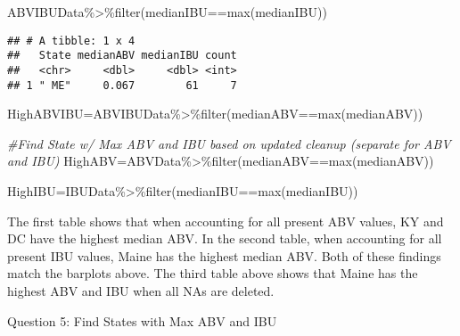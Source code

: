 \documentclass[
]{article}
\newenvironment{Shaded}{\begin{snugshade}}{\end{snugshade}}
\newcommand{\CommentTok}[1]{\textcolor[rgb]{0.56,0.35,0.01}{\textit{#1}}}
\newcommand{\FunctionTok}[1]{\textcolor[rgb]{0.00,0.00,0.00}{#1}}
\newcommand{\NormalTok}[1]{#1}
\newcommand{\OtherTok}[1]{\textcolor[rgb]{0.56,0.35,0.01}{#1}}
\newcommand{\SpecialCharTok}[1]{\textcolor[rgb]{0.00,0.00,0.00}{#1}}
\begin{document}
\begin{Shaded}
\begin{Highlighting}[]
\NormalTok{ABVIBUData}\SpecialCharTok{\%\textgreater{}\%}\FunctionTok{filter}\NormalTok{(medianIBU}\SpecialCharTok{==}\FunctionTok{max}\NormalTok{(medianIBU))}
\end{Highlighting}
\end{Shaded}

\begin{verbatim}
## # A tibble: 1 x 4
##   State medianABV medianIBU count
##   <chr>     <dbl>     <dbl> <int>
## 1 " ME"     0.067        61     7
\end{verbatim}

\begin{Shaded}
\begin{Highlighting}[]
\NormalTok{HighABVIBU}\OtherTok{=}\NormalTok{ABVIBUData}\SpecialCharTok{\%\textgreater{}\%}\FunctionTok{filter}\NormalTok{(medianABV}\SpecialCharTok{==}\FunctionTok{max}\NormalTok{(medianABV))}



\CommentTok{\#Find State w/ Max ABV and IBU based on updated cleanup (separate for ABV and IBU)}
\NormalTok{HighABV}\OtherTok{=}\NormalTok{ABVData}\SpecialCharTok{\%\textgreater{}\%}\FunctionTok{filter}\NormalTok{(medianABV}\SpecialCharTok{==}\FunctionTok{max}\NormalTok{(medianABV))}



\NormalTok{HighIBU}\OtherTok{=}\NormalTok{IBUData}\SpecialCharTok{\%\textgreater{}\%}\FunctionTok{filter}\NormalTok{(medianIBU}\SpecialCharTok{==}\FunctionTok{max}\NormalTok{(medianIBU))}
\end{Highlighting}
\end{Shaded}

The first table shows that when accounting for all present ABV values,
KY and DC have the highest median ABV. In the second table, when
accounting for all present IBU values, Maine has the highest median ABV.
Both of these findings match the barplots above. The third table above
shows that Maine has the highest ABV and IBU when all NAs are deleted.

Question 5: Find States with Max ABV and IBU
\end{document}
